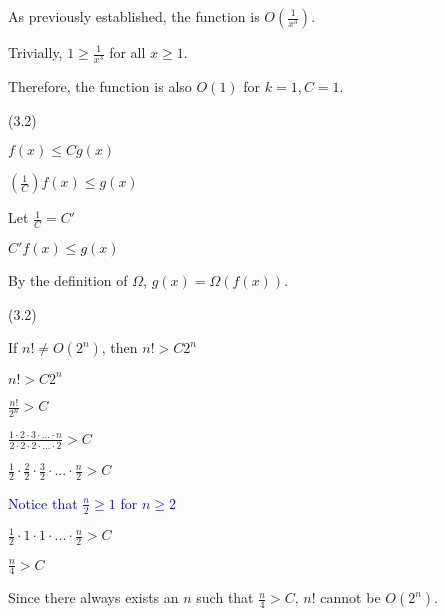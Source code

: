 \documentclass{exam}
\begin{document}
\begin{questions}
\begin{center}

As previously established, the function is \(O(\frac{1}{x^3})\).

Trivially, \(1 \geq \frac{1}{x^3}\) for all \(x \geq 1\).

Therefore, the function is also \(O(1)\) for \(k = 1, C = 1\).

\end{center}

\newpage

 (3.2)

\begin{center}

\( f(x) \leq Cg(x) \)

\( (\frac{1}{C})f(x) \leq g(x) \)

Let \(\frac{1}{C} = C'\)

\( C'f(x) \leq g(x) \)

By the definition of \(\Omega\), \(g(x) = \Omega(f(x))\).

\end{center}

 (3.2)

\begin{center}

If \(n! \neq O(2^n)\), then \(n! > C2^n\)

\( n! > C2^n \)

\( \frac{n!}{2^n} > C \)

\( \frac{1 \cdot 2 \cdot 3 \cdot ... \cdot n}{2 \cdot 2 \cdot 2 \cdot ... \cdot 2} > C\)

\( \frac{1}{2} \cdot \frac{2}{2} \cdot \frac{3}{2} \cdot ... \cdot \frac{n}{2} > C\)

\textcolor{blue}{Notice that \(\frac{n}{2} \geq 1\) for \(n \geq 2\)}

\( \frac{1}{2} \cdot 1 \cdot 1 \cdot ... \cdot \frac{n}{2} > C\)

\( \frac{n}{4} > C\)

Since there always exists an \(n\) such that \(\frac{n}{4} > C\), \(n!\) cannot be \(O(2^n)\).

\end{center}


\begin{center}


\end{center}
\end{questions}
\end{document}
